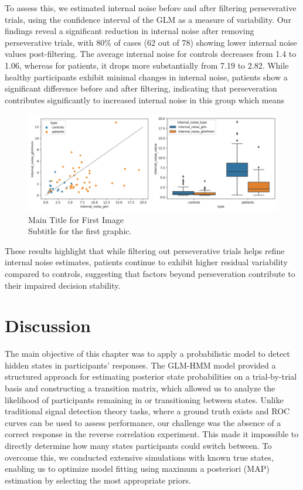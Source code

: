 To assess this, we estimated internal noise before and after filtering perseverative trials, using the confidence interval of the GLM as a measure of variability. Our findings reveal a significant reduction in internal noise after removing perseverative trials, with 80\% of cases (62 out of 78) showing lower internal noise values post-filtering. The average internal noise for controls decreases from 1.4 to 1.06, whereas for patients, it drops more substantially from 7.19 to 2.82. While healthy participants exhibit minimal changes in internal noise, patients show a significant difference before and after filtering, indicating that perseveration contributes significantly to increased internal noise in this group which means 
\begin{figure}[H]
    \centering
    \includegraphics[width=16cm]{MainLayout/Images/chapter7/internal_noise_comparison.png}
    \caption{Main Title for First Image \\ \small Subtitle for the first graphic.}
    \label{fig:corr_distance}
\end{figure}

These results highlight that while filtering out perseverative trials helps refine internal noise estimates, patients continue to exhibit higher residual variability compared to controls, suggesting that factors beyond perseveration contribute to their impaired decision stability.


\section {Discussion} 

The main objective of this chapter was to apply a probabilistic model to detect hidden states in participants' responses. The GLM-HMM model provided a structured approach for estimating posterior state probabilities on a trial-by-trial basis and constructing a transition matrix, which allowed us to analyze the likelihood of participants remaining in or transitioning between states. Unlike traditional signal detection theory tasks, where a ground truth exists and ROC curves can be used to assess performance, our challenge was the absence of a correct response in the reverse correlation experiment. This made it impossible to directly determine how many states participants could switch between. To overcome this, we conducted extensive simulations with known true states, enabling us to optimize model fitting using maximum a posteriori (MAP) estimation by selecting the most appropriate priors.

